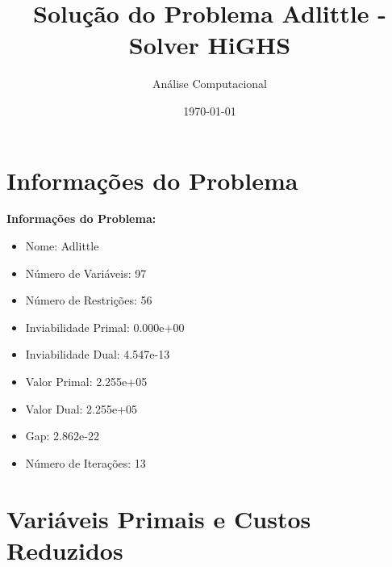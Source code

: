 \documentclass[12pt]{article}
\title{Solução do Problema Adlittle - Solver HiGHS}
\author{Análise Computacional}
\date{\today}
\begin{document}
\maketitle

\section{Informações do Problema}

\textbf{Informações do Problema:}
\begin{itemize}
\item Nome: Adlittle
\item Número de Variáveis: 97
\item Número de Restrições: 56
\item Inviabilidade Primal: 0.000e+00
\item Inviabilidade Dual: 4.547e-13
\item Valor Primal: 2.255e+05
\item Valor Dual: 2.255e+05
\item Gap: 2.862e-22
\item Número de Iterações: 13
\end{itemize}


\section{Variáveis Primais e Custos Reduzidos}
\end{document}
